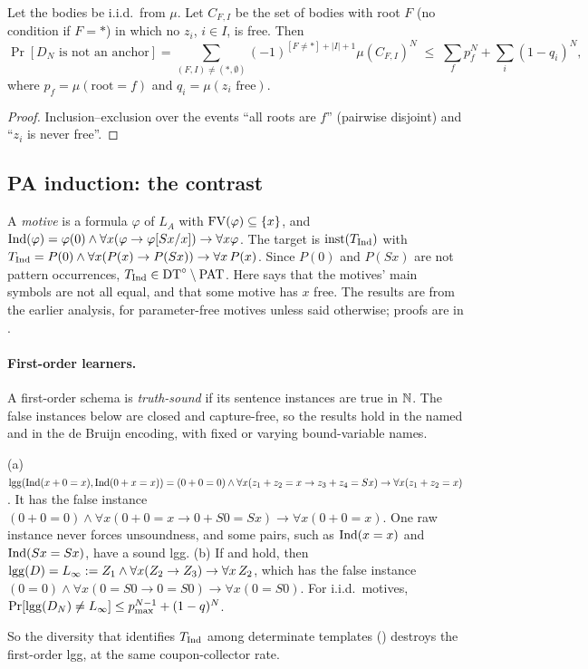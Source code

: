 \begin{theorem}[Rates]\label{thm:zf:rates}
Let the bodies be i.i.d.\ from $\mu$. Let $C_{F,I}$ be the set of bodies with root $F$ (no condition if $F={*}$) in
which no $z_i$, $i\in I$, is free. Then
\[\Pr[D_N\text{ is not an anchor}]=\sum_{(F,I)\ne({*},\emptyset)}(-1)^{[F\ne{*}]+|I|+1}\mu(C_{F,I})^N\;\le\;\sum_f
p_f^N+\sum_i(1-q_i)^N,\]
where $p_f=\mu(\mathrm{root}=f)$ and $q_i=\mu(z_i\text{ free})$.
\end{theorem}
\begin{proof}
Inclusion--exclusion over the events ``all roots are $f$'' (pairwise disjoint) and ``$z_i$ is never free''.
\end{proof}

\subsection{PA induction: the contrast}\label{sec:zf:pa}

A \emph{motive} is a formula $\varphi$ of $L_A$ with $\mathrm{FV}(\varphi)\subseteq\{x\}$, and
$\mathrm{Ind}(\varphi)=\varphi(0)\wedge\forall x(\varphi\to\varphi[Sx/x])\to\forall x\varphi$. The target is
$\mathrm{inst}(T_{\mathrm{Ind}})$ with $T_{\mathrm{Ind}}=P(0)\wedge\forall x(P(x)\to P(Sx))\to\forall x\,P(x)$. Since $P(0)$ and $P(Sx)$ are
not pattern occurrences, $T_{\mathrm{Ind}}\in\mathrm{DT}^{\circ}\setminus\mathrm{PAT}$. Here \evR{} says that the motives' main symbols are not all
equal, and \evN{} that some motive has $x$ free. The results are from the earlier analysis, for parameter-free motives
unless said otherwise; proofs are in .

\paragraph{First-order learners.} A first-order schema is \emph{truth-sound} if its sentence instances are true in
$\mathbb{N}$. The false instances below are closed and capture-free, so the results hold in the named and in the de Bruijn
encoding, with fixed or varying bound-variable names.

\begin{proposition}\label{prop:zf:indtwo}
(a) $\mathrm{lgg}(\mathrm{Ind}(x+0=x),\mathrm{Ind}(0+x=x))=(0+0=0)\wedge\forall x(z_1+z_2=x\to z_3+z_4=Sx)\to\forall x(z_1+z_2=x)$. It has
the false instance $(0+0=0)\wedge\forall x(0+0=x\to0+S0=Sx)\to\forall x(0+0=x)$. One raw instance never forces
unsoundness, and some pairs, such as $\mathrm{Ind}(x=x)$ and $\mathrm{Ind}(Sx=Sx)$, have a sound lgg.
(b) If \evR{} and \evN{} hold, then $\mathrm{lgg}(D)=L_{\infty}:=Z_1\wedge\forall x(Z_2\to Z_3)\to\forall x\,Z_2$, which has the
false instance $(0=0)\wedge\forall x(0=S0\to0=S0)\to\forall x(0=S0)$. For i.i.d.\ motives,
$\Pr[\mathrm{lgg}(D_N)\ne L_{\infty}]\le p_{\max}^{N-1}+(1-q)^N$.
\end{proposition}
So the diversity that identifies $T_{\mathrm{Ind}}$ among determinate templates () destroys the
first-order lgg, at the same coupon-collector rate.

